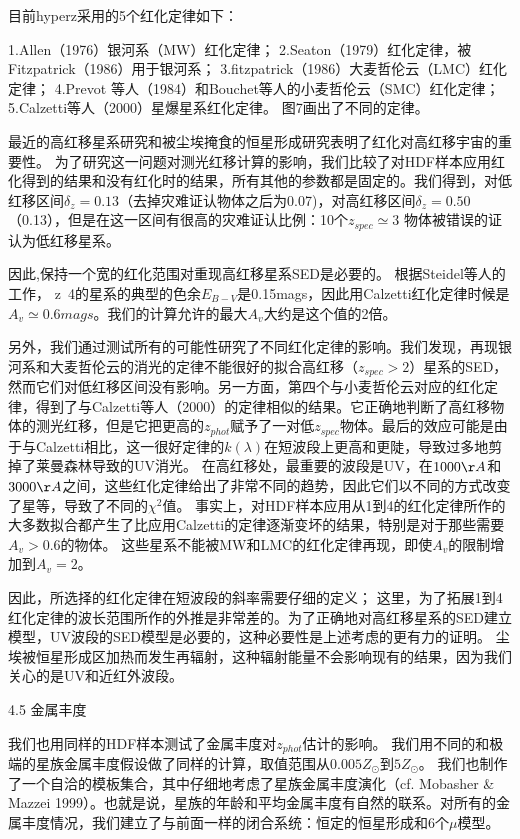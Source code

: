目前hyperz采用的5个红化定律如下：
 
1.Allen（1976）银河系（MW）红化定律；
2.Seaton（1979）红化定律，被Fitzpatrick（1986）用于银河系；
3.fitzpatrick（1986）大麦哲伦云（LMC）红化定律；
4.Prevot 等人（1984）和Bouchet等人的小麦哲伦云（SMC）红化定律；
5.Calzetti等人（2000）星爆星系红化定律。
图7画出了不同的定律。
 
最近的高红移星系研究和被尘埃掩食的恒星形成研究表明了红化对高红移宇宙的重要性。
为了研究这一问题对测光红移计算的影响，我们比较了对HDF样本应用红化得到的结果和没有红化时的结果，所有其他的参数都是固定的。我们得到，对低红移区间$\delta_z=0.13$（去掉灾难证认物体之后为0.07)，对高红移区间$\delta_z=0.50$（0.13），但是在这一区间有很高的灾难证认比例：10个$z_{spec} \simeq 3$ 物体被错误的证认为低红移星系。
 
因此,保持一个宽的红化范围对重现高红移星系SED是必要的。
根据Steidel等人的工作，
z~4的星系的典型的色余$E_{B-V}$是0.15mags，因此用Calzetti红化定律时候是$A_v\simeq0.6 mags$。我们的计算允许的最大$A_v$大约是这个值的2倍。
 
另外，我们通过测试所有的可能性研究了不同红化定律的影响。我们发现，再现银河系和大麦哲伦云的消光的定律不能很好的拟合高红移（$z_{spec}>2$）星系的SED，然而它们对低红移区间没有影响。另一方面，第四个与小麦哲伦云对应的红化定律，得到了与Calzetti等人（2000）的定律相似的结果。它正确地判断了高红移物体的测光红移，但是它把更高的$z_{phot}$赋予了一对低$z_{spec}$物体。最后的效应可能是由于与Calzetti相比，这一很好定律的$k(\lambda)$在短波段上更高和更陡，导致过多地剪掉了莱曼森林导致的UV消光。
在高红移处，最重要的波段是UV，在$1000\AA$和$3000\AA$之间，这些红化定律给出了非常不同的趋势，因此它们以不同的方式改变了星等，导致了不同的$\chi^2$值。
事实上，对HDF样本应用从1到4的红化定律所作的大多数拟合都产生了比应用Calzetti的定律逐渐变坏的结果，特别是对于那些需要$A_v>0.6$的物体。
这些星系不能被MW和LMC的红化定律再现，即使$A_v$的限制增加到$A_v=2$。
 
因此，所选择的红化定律在短波段的斜率需要仔细的定义；
这里，为了拓展1到4红化定律的波长范围所作的外推是非常差的。为了正确地对高红移星系的SED建立模型，UV波段的SED模型是必要的，这种必要性是上述考虑的更有力的证明。
尘埃被恒星形成区加热而发生再辐射，这种辐射能量不会影响现有的结果，因为我们关心的是UV和近红外波段。
 
4.5 金属丰度
 
我们也用同样的HDF样本测试了金属丰度对$z_{phot}$估计的影响。
我们用不同的和极端的星族金属丰度假设做了同样的计算，取值范围从$0.005Z_\odot$到$5Z_\odot$。
我们也制作了一个自洽的模板集合，其中仔细地考虑了星族金属丰度演化（cf. Mobasher \& Mazzei 1999）。也就是说，星族的年龄和平均金属丰度有自然的联系。对所有的金属丰度情况，我们建立了与前面一样的闭合系统：恒定的恒星形成和6个$\mu$模型。
 

